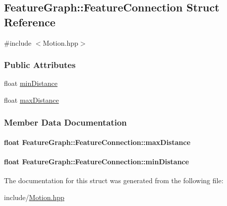 \hypertarget{structFeatureGraph_1_1FeatureConnection}{\subsection{Feature\-Graph\-:\-:Feature\-Connection Struct Reference}
\label{structFeatureGraph_1_1FeatureConnection}
}


{\ttfamily \#include $<$Motion.\-hpp$>$}

\subsubsection*{Public Attributes}
\begin{DoxyCompactItemize}
\item 
float \hyperlink{structFeatureGraph_1_1FeatureConnection_ad19c4e45cfeb673ca554081eb593958e}{min\-Distance}
\item 
float \hyperlink{structFeatureGraph_1_1FeatureConnection_ae327f4ab6ac124456d19a95aa2221ad8}{max\-Distance}
\end{DoxyCompactItemize}


\subsubsection{Member Data Documentation}
\hypertarget{structFeatureGraph_1_1FeatureConnection_ae327f4ab6ac124456d19a95aa2221ad8}{
\paragraph[{max\-Distance}]{\setlength{\rightskip}{0pt plus 5cm}float Feature\-Graph\-::\-Feature\-Connection\-::max\-Distance}}\label{structFeatureGraph_1_1FeatureConnection_ae327f4ab6ac124456d19a95aa2221ad8}
\hypertarget{structFeatureGraph_1_1FeatureConnection_ad19c4e45cfeb673ca554081eb593958e}{
\paragraph[{min\-Distance}]{\setlength{\rightskip}{0pt plus 5cm}float Feature\-Graph\-::\-Feature\-Connection\-::min\-Distance}}\label{structFeatureGraph_1_1FeatureConnection_ad19c4e45cfeb673ca554081eb593958e}


The documentation for this struct was generated from the following file\-:\begin{DoxyCompactItemize}
\item 
include/\hyperlink{Motion_8hpp}{Motion.\-hpp}\end{DoxyCompactItemize}
